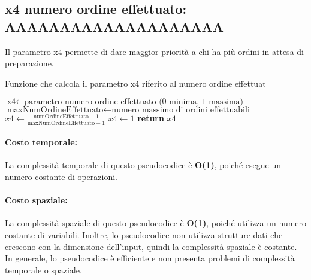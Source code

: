 \subsection{x4 numero ordine effettuato: AAAAAAAAAAAAAAAAAAAA}
Il  parametro x4 permette di dare maggior priorità a chi ha più ordini in attesa di preparazione.
\begin{algorithm}[h]
	\begin{algorithmic}[h!]
		\caption{Funzione che calcola il parametro x4 riferito al numero ordine effettuat}
		\medskip
		\State $\text{x4} \gets \text{parametro numero ordine effettuato (0 minima, 1 massima)}$
		\State $\text{maxNumOrdineEffettuato} \gets \text{numero massimo di ordini effettuabili}$
		\medskip
		\State $x4 \gets \frac{\text{numOrdineEffettuato} - 1}{\text{maxNumOrdineEffettuato} - 1}$ 
		\Else
		\State $x4 \gets 1$ 
		\EndIf
		\State \textbf{return} $x4$
		\EndFunction
	\end{algorithmic}
\end{algorithm}

\paragraph{Costo temporale:}
La complessità temporale di questo pseudocodice è \textbf{O(1)}, poiché esegue un numero costante di operazioni.

\paragraph{Costo spaziale:}
La complessità spaziale di questo pseudocodice è \textbf{O(1)}, poiché utilizza un numero costante di variabili. Inoltre, lo pseudocodice non utilizza strutture dati che crescono con la dimensione dell'input, quindi la complessità spaziale è costante. In generale, lo pseudocodice è efficiente e non presenta problemi di complessità temporale o spaziale.

